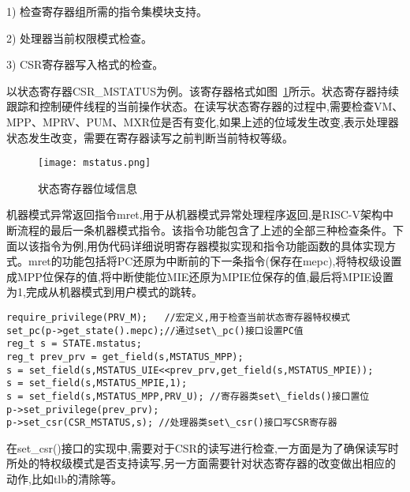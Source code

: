 1) 检查寄存器组所需的指令集模块支持。


2) 处理器当前权限模式检查。


3) CSR寄存器写入格式的检查。


以状态寄存器CSR\_MSTATUS为例。该寄存器格式如图~\ref{fig:mstatus}所示。状态寄存器持续跟踪和控制硬件线程的当前操作状态。在读写状态寄存器的过程中,需要检查VM、MPP、MPRV、PUM、MXR位是否有变化,如果上述的位域发生改变,表示处理器状态发生改变，需要在寄存器读写之前判断当前特权等级。
\begin{figure}[H]
    \centering
    \texttt{[image: mstatus.png]}
    \caption{状态寄存器位域信息}
    \label{fig:mstatus}
\end{figure}


机器模式异常返回指令mret,用于从机器模式异常处理程序返回,是RISC-V架构中断流程的最后一条机器模式指令。该指令功能包含了上述的全部三种检查条件。下面以该指令为例,用伪代码详细说明寄存器模拟实现和指令功能函数的具体实现方式。mret的功能包括将PC还原为中断前的下一条指令(保存在mepc),将特权级设置成MPP位保存的值,将中断使能位MIE还原为MPIE位保存的值,最后将MPIE设置为1,完成从机器模式到用户模式的跳转。
\begin{lstlisting}
require_privilege(PRV_M);   //宏定义,用于检查当前状态寄存器特权模式
set_pc(p->get_state().mepc);//通过set\_pc()接口设置PC值
reg_t s = STATE.mstatus;    
reg_t prev_prv = get_field(s,MSTATUS_MPP);
s = set_field(s,MSTATUS_UIE<<prev_prv,get_field(s,MSTATUS_MPIE));
s = set_field(s,MSTATUS_MPIE,1); 
s = set_field(s,MSTATUS_MPP,PRV_U); //寄存器类set\_fields()接口置位
p->set_privilege(prev_prv);
p->set_csr(CSR_MSTATUS,s); //处理器类set\_csr()接口写CSR寄存器
\end{lstlisting}

在set\_csr()接口的实现中,需要对于CSR的读写进行检查,一方面是为了确保读写时所处的特权级模式是否支持读写,另一方面需要针对状态寄存器的改变做出相应的动作,比如tlb的清除等。

